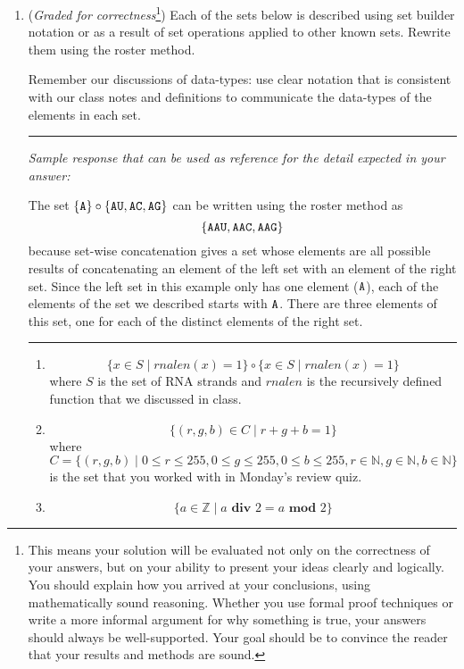 \begin{enumerate}

\item ({\it Graded for correctness}\footnote{This means your solution will be
evaluated not only on the correctness of your answers, but on your ability to 
present your ideas clearly and logically. You should explain how you arrived at 
your conclusions, using 
mathematically sound reasoning. Whether you use formal proof techniques or 
write a more informal argument for why 
something is true, your answers should always be well-supported. Your goal 
should be to convince the reader that 
your results and methods are sound.}) Each of the sets below is described 
using set builder notation or as a result of set operations
applied to other known sets.  Rewrite them using the roster method.

Remember our discussions of data-types: use clear notation that 
is consistent with our class notes and definitions 
to communicate the data-types of the elements in each set.


\rule{0.5\textwidth}{.4pt}

{\it Sample response that can be used as reference for the detail expected 
in your answer:} 

The set $\{ \texttt{A} \} \circ \{ \texttt{A}\texttt{U}, \texttt{A}\texttt{C}, \texttt{A}\texttt{G}\}$ can be written using
the roster method as 
\[
\{ \texttt{A}\texttt{A}\texttt{U}, \texttt{A}\texttt{A}\texttt{C}, \texttt{A}\texttt{A}\texttt{G} \}
\]
because set-wise concatenation gives a set whose elements are 
all possible results of concatenating an element of the 
left set with an 
element of the right set. Since the left set in this example only
has one element ($\texttt{A}$), each of the elements of the set we 
described starts with $\texttt{A}$. There are three elements of this set, 
one for each of the distinct elements of the right set.

\rule{0.5\textwidth}{.4pt}

\begin{enumerate}
\item $$\{ x \in S \mid rnalen(x) = 1 \} \circ \{x \in S \mid rnalen(x) = 1 \}$$
where $S$ is the set of RNA strands and $rnalen$ is the recursively defined
function that we discussed in class.
\item $$\{ (r,g,b) \in C \mid r+g+b = 1\}$$ where 
$C = \{ (r,g,b) \mid 0 \leq r \leq 255, 0 \leq g \leq 255, 0 \leq b \leq 255, r \in \mathbb{N}, g \in \mathbb{N}, b \in \mathbb{N} \}$
is the set that you worked with in Monday's review quiz.
\item $$\{ a \in \mathbb{Z} \mid  a \textbf{ div } 2 = a \textbf{ mod } 2\}$$
\end{enumerate}


\end{enumerate}
